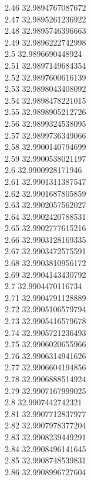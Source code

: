 {2.46	32.9894767087672\\
2.47	32.9895261236922\\
2.48	32.9895746396663\\
2.49	32.9896222742998\\
2.5	32.9896690448924\\
2.51	32.9897149684354\\
2.52	32.9897600616139\\
2.53	32.9898043408092\\
2.54	32.9898478221015\\
2.55	32.9898905212726\\
2.56	32.9899324538095\\
2.57	32.9899736349066\\
2.58	32.9900140794699\\
2.59	32.9900538021197\\
2.6	32.9900928171946\\
2.61	32.9901311387547\\
2.62	32.9901687805859\\
2.63	32.9902057562027\\
2.64	32.9902420788531\\
2.65	32.9902777615216\\
2.66	32.9903128169335\\
2.67	32.9903472575591\\
2.68	32.9903810956172\\
2.69	32.9904143430792\\
2.7	32.9904470116734\\
2.71	32.9904791128889\\
2.72	32.9905106579794\\
2.73	32.9905416579678\\
2.74	32.9905721236493\\
2.75	32.9906020655966\\
2.76	32.9906314941626\\
2.77	32.9906604194856\\
2.78	32.9906888514924\\
2.79	32.9907167999025\\
2.8	32.9907442742321\\
2.81	32.9907712837977\\
2.82	32.9907978377204\\
2.83	32.9908239449291\\
2.84	32.9908496141645\\
2.85	32.9908748539831\\
2.86	32.9908996727604\\
}
